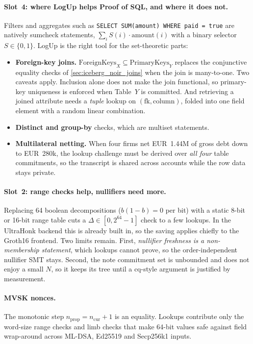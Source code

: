 \documentclass[a4paper,11pt,twoside,parskip=half-,headings=small]{scrartcl}
\newcommand{\code}[1]{\texttt{#1}}
\begin{document}
\paragraph{Slot~4: where LogUp helps Proof of SQL, and where it does not.}
Filters and aggregates such as \code{SELECT SUM(amount) WHERE paid = true} are natively sumcheck statements, $\sum_i S(i)\cdot \text{amount}(i)$ with a binary selector $S \in \{0,1\}$. LogUp is the right tool for the set-theoretic parts:
\begin{itemize}[nosep]
  \item \textbf{Foreign-key joins.} $\text{ForeignKeys}_X \subseteq \text{PrimaryKeys}_Y$ replaces the conjunctive equality checks of \cref{sec:iceberg_noir_joins} when the join is many-to-one. Two caveats apply. Inclusion alone does not make the join functional, so primary-key uniqueness is enforced when Table~$Y$ is committed. And retrieving a joined attribute needs a \emph{tuple} lookup on $(\text{fk},\text{column})$, folded into one field element with a random linear combination.
  \item \textbf{Distinct and group-by} checks, which are multiset statements.
  \item \textbf{Multilateral netting.} When four firms net EUR~1.44M of gross debt down to EUR~280k, the lookup challenge must be derived over \emph{all four} table commitments, so the transcript is shared across accounts while the row data stays private.
\end{itemize}

\paragraph{Slot~2: range checks help, nullifiers need more.}
Replacing 64 boolean decompositions ($b(1-b)=0$ per bit) with a static 8-bit or 16-bit range table cuts a $\Delta \in [0, 2^{64}-1]$ check to a few lookups. In the UltraHonk backend this is already built in, so the saving applies chiefly to the Groth16 frontend. Two limits remain. First, \emph{nullifier freshness is a non-membership statement}, which lookups cannot prove, so the order-independent nullifier SMT stays. Second, the note commitment set is unbounded and does not enjoy a small $N$, so it keeps its tree until a cq-style argument is justified by measurement.

\paragraph{MVSK nonces.} The monotonic step $n_{\text{prop}} = n_{\text{cur}} + 1$ is an equality. Lookups contribute only the word-size range checks and limb checks that make 64-bit values safe against field wrap-around across ML-DSA, Ed25519 and Secp256k1 inputs.
\end{document}

